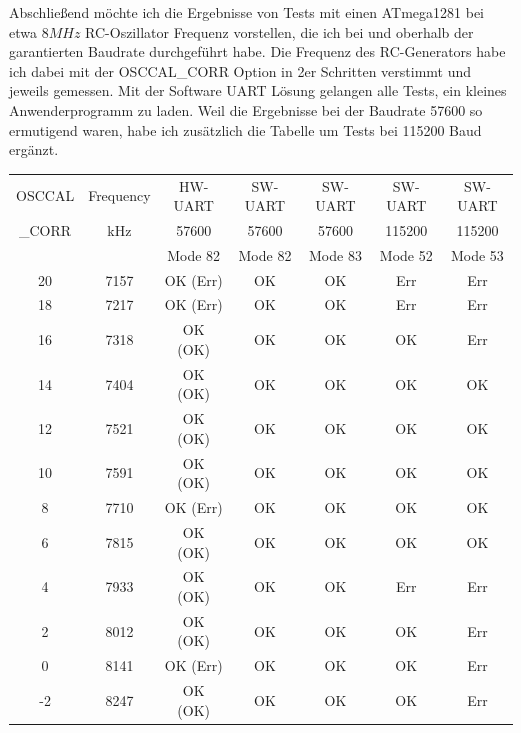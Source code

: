 Abschließend möchte ich die Ergebnisse von Tests mit einen ATmega1281 bei etwa \(8MHz\)
RC-Oszillator Frequenz vorstellen, die ich bei und oberhalb der garantierten Baudrate
durchgeführt habe. Die Frequenz des RC-Generators habe ich dabei mit der
OSCCAL\_CORR Option in 2er Schritten verstimmt und jeweils gemessen.
Mit der Software UART Lösung gelangen alle Tests, ein kleines Anwenderprogramm
zu laden. Weil die Ergebnisse bei der Baudrate 57600
so ermutigend waren, habe ich zusätzlich die Tabelle um Tests bei 115200 Baud
ergänzt. 

\begin{table}[H]
  \begin{center}
    \begin{tabular}{| c | c || c | c | c || c | c |}
    \hline
   OSCCAL  & Frequency & HW-UART & SW-UART & SW-UART & SW-UART & SW-UART \\
   \_CORR  & kHz       & 57600   & 57600   & 57600   & 115200  & 115200  \\
           &           & Mode 82 & Mode 82 & Mode 83 & Mode 52 & Mode 53 \\
    \hline
    \hline
    20     &  7157   &  OK (Err)  &   OK     &   OK    &  Err    &   Err \\
    18     &  7217   &  OK (Err)  &   OK     &   OK    &  Err    &   Err \\
    \hline
    16     &  7318   &  OK (OK)   &   OK     &   OK    &  OK     &   Err \\
    14     &  7404   &  OK (OK)   &   OK     &   OK    &  OK     &   OK  \\
    \hline
    12     &  7521   &  OK (OK)   &   OK     &   OK    &  OK     &   OK  \\
    10     &  7591   &  OK (OK)   &   OK     &   OK    &  OK     &   OK  \\
    \hline
     8     &  7710   &  OK (Err)  &   OK     &   OK    &  OK     &   OK  \\
     6     &  7815   &  OK (OK)   &   OK     &   OK    &  OK     &   OK  \\
    \hline
     4     &  7933   &  OK (OK)   &   OK     &   OK    &  Err    &   Err \\
     2     &  8012   &  OK (OK)   &   OK     &   OK    &  OK     &   Err \\
    \hline
     0     &  8141   &  OK (Err)  &   OK     &   OK    &  OK     &   Err \\
    -2     &  8247   &  OK (OK)   &   OK     &   OK    &  OK     &   Err \\

\end{tabular}
\end{center}
\end{table}
